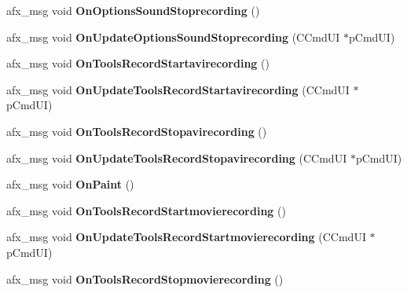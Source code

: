 \begin{DoxyCompactItemize}
\item 
\mbox{\label{class_main_wnd_ab2f36ba26274b2b2d5b9f2cd5d74f9f2}} 
afx\+\_\+msg void {\bfseries On\+Options\+Sound\+Stoprecording} ()
\item 
\mbox{\label{class_main_wnd_af54c122c1f7c4787b8441f35384da473}} 
afx\+\_\+msg void {\bfseries On\+Update\+Options\+Sound\+Stoprecording} (C\+Cmd\+UI $\ast$p\+Cmd\+UI)
\item 
\mbox{\label{class_main_wnd_ae512a86963451914ea7eee95c85d6280}} 
afx\+\_\+msg void {\bfseries On\+Tools\+Record\+Startavirecording} ()
\item 
\mbox{\label{class_main_wnd_a56e8845d8092224b874101a2deb947b9}} 
afx\+\_\+msg void {\bfseries On\+Update\+Tools\+Record\+Startavirecording} (C\+Cmd\+UI $\ast$p\+Cmd\+UI)
\item 
\mbox{\label{class_main_wnd_a46eb975ae0f428195025c8c2a83fcabb}} 
afx\+\_\+msg void {\bfseries On\+Tools\+Record\+Stopavirecording} ()
\item 
\mbox{\label{class_main_wnd_a3265cdcc2e36ee6c34137fc470b6b7e0}} 
afx\+\_\+msg void {\bfseries On\+Update\+Tools\+Record\+Stopavirecording} (C\+Cmd\+UI $\ast$p\+Cmd\+UI)
\item 
\mbox{\label{class_main_wnd_a0c100c54d2e6d48fa3f68d2da1609e65}} 
afx\+\_\+msg void {\bfseries On\+Paint} ()
\item 
\mbox{\label{class_main_wnd_af473a4d7ccfadb980b92de352ea6a4ae}} 
afx\+\_\+msg void {\bfseries On\+Tools\+Record\+Startmovierecording} ()
\item 
\mbox{\label{class_main_wnd_acd6ea3612f6959388549defbb7398b16}} 
afx\+\_\+msg void {\bfseries On\+Update\+Tools\+Record\+Startmovierecording} (C\+Cmd\+UI $\ast$p\+Cmd\+UI)
\item 
\mbox{\label{class_main_wnd_a5bd28d030d2596417ba4479fe7a5dfad}} 
afx\+\_\+msg void {\bfseries On\+Tools\+Record\+Stopmovierecording} ()
\item 
\mbox{\label{class_main_wnd_aa72a602faefe912310c776e32445c708}} 

\end{DoxyCompactItemize}
